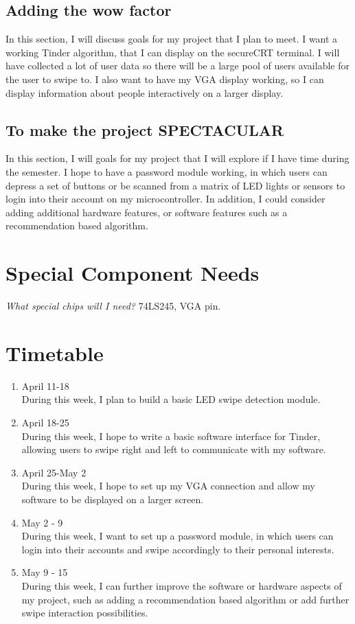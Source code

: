 \documentclass[12pt,twoside]{article}
\begin{document}
\subsection{Adding the wow factor}
In this section, I will discuss goals for my project that I plan to meet. I want a working Tinder algorithm, that I can display on the secureCRT terminal. I will have collected a lot of user data so there will be a large pool of users available for the user to swipe to. I also want to have my VGA display working, so I can display information about people interactively on a larger display. 

\subsection{To make the project SPECTACULAR}
In this section, I will goals for my project that I will explore if I have time during the semester. I hope to have a password module working, in which users can depress a set of buttons or be scanned from a matrix of LED lights or sensors to login into their account on my microcontroller. In addition, I could consider adding additional hardware features, or software features such as a recommendation based algorithm. 


\section{Special Component Needs}
\emph{What special chips will I need?} 74LS245, VGA pin. 


\section{Timetable}
\begin{enumerate}
\item April 11-18
\\ \indent During this week, I plan to build a basic LED swipe detection module. 
\item April 18-25
\\ \indent During this week, I hope to write a basic software interface for Tinder, allowing users to swipe right and left to communicate with my software. 
\item April 25-May 2
\\ \indent During this week, I hope to set up my VGA connection and allow my software to be displayed on a larger screen.
\item May 2 - 9
\\ \indent During this week, I want to set up a password module, in which users can login into their accounts and swipe accordingly to their personal interests. 
\item May 9 - 15
\\ \indent During this week, I can further improve the software or hardware aspects of my project, such as adding a recommendation based algorithm or add further swipe interaction possibilities. 
\end{enumerate}
\end{document}
